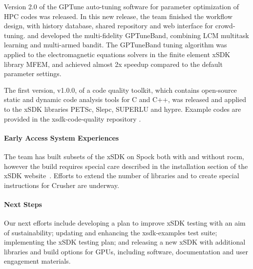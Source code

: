 Version 2.0 of the GPTune auto-tuning software for parameter optimization of HPC codes \cite{gptune:homepage} was released. In this new release, the team finished the workflow design, with history database, shared repository and web interface for crowd-tuning. and developed the multi-fidelity GPTuneBand, combining LCM multitask learning and multi-armed bandit. The  GPTuneBand tuning algorithm was applied to the electromagnetic equations solvers in the finite element xSDK library MFEM, and achieved almost 2x speedup compared to the default parameter settings.     

The first version, v1.0.0, of a code quality toolkit, which contains open-source static and dynamic code analysis tools for C and C++, was released and applied to the xSDK libraries PETSc, Slepc, SUPERLU and hypre. Example codes are provided in the xsdk-code-quality repository \cite{xsdk-code-quality}.

\paragraph{Early Access System Experiences}

The team has built subsets of the xSDK on Spock both with and without rocm, however the build requires special care described in the installation section of the xSDK website~\cite{xsdk:homepage}. Efforts to extend the number of libraries and to create special instructions for Crusher are underway.

\paragraph{Next Steps}

Our next efforts include 
%
    developing a plan to improve xSDK testing with an aim of sustainability;
    updating and enhancing the xsdk-examples test suite;
    implementing the xSDK testing plan; and
    releasing a new xSDK with additional libraries and build options for GPUs, including software, documentation and user engagement materials.



